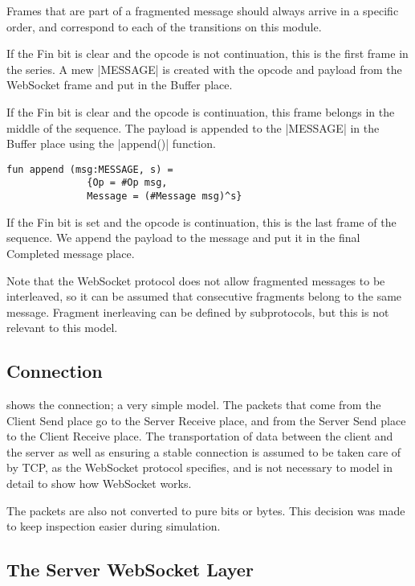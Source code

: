 			Frames that are part of a fragmented message should always arrive in a
			specific order, and correspond to each of the transitions on this module. 
			
			If the Fin bit is clear and the opcode is not continuation, this is the first
			frame in the series. A mew |MESSAGE| is created with the opcode and
			payload from the WebSocket frame and put in the Buffer place.
			
			If the Fin bit is clear and the opcode is continuation, this frame belongs in
			the middle of the sequence. The payload is appended to the
			|MESSAGE| in the Buffer place using the |append()|
			function.
			
			\begin{lstlisting}[label=lst:append,caption=append,gobble=3]
			fun append (msg:MESSAGE, s) = 
			  {Op = #Op msg,
			  Message = (#Message msg)^s}
			\end{lstlisting}
			
			If the Fin bit is set and the opcode is continuation, this is the last frame
			of the sequence. We append the payload to the message and put it in the final
			Completed message place. 
			
			Note that the WebSocket protocol does not allow fragmented messages to be
			interleaved, so it can be assumed that consecutive fragments belong to the
			same message. Fragment inerleaving can be defined by subprotocols, but this
			is not relevant to this model.
			
\subsection{Connection}

	
	 shows the connection; a very simple model. The packets that
	come from the Client Send place go to the Server Receive place, and from the
	Server Send place to the Client Receive place. The transportation of data
	between the client and the server as well as ensuring a stable connection is
	assumed to be taken care of by TCP, as the WebSocket protocol specifies, and
	is not necessary to model in detail to show how WebSocket works. 
	
	The packets are also not converted to pure bits or bytes. This decision was
	made to keep inspection easier during simulation. 

\subsection{The Server WebSocket Layer}
	
